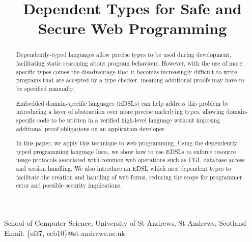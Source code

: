 \documentclass[]{sigplanconf}
\begin{document}
\newcommand{\idris}{\textsc{Idris}}
\newcommand{\idata}{\textsf{iData}}
\newcommand{\itasks}{\textsf{iTasks}}
\newcommand{\Idris}{\textsc{Idris}}
\setlength{\pdfpageheight}{\paperheight}
\setlength{\pdfpagewidth}{\paperwidth}

\exclusivelicense
{} 





\titlebanner{}        %
\preprintfooter{}   %

\title{Dependent Types for Safe and Secure Web Programming}
           {School of Computer Science, University of St Andrews, St Andrews, Scotland}
           {Email: \{sf37, ecb10\}@st-andrews.ac.uk}

\maketitle

\begin{abstract}
Dependently-typed languages allow precise types to be used during development,
facilitating static reasoning about program behaviour. However,
with the use of more specific types comes the disadvantage that it becomes increasingly difficult to
write programs that are accepted by a type checker, meaning additional proofs may have to be specified manually.

Embedded domain-specific languages (EDSLs) can help address this problem by
introducing a layer of abstraction over more precise underlying types,
allowing domain-specific code to be written in a verified high-level language without imposing additional proof
obligations on an application developer. 

In this paper, we apply this technique to web programming.  Using the
dependently typed programming language \Idris{}, we show how to use EDSLs to enforce resource usage protocols associated with common web operations such as CGI, database access and session handling. We also introduce an EDSL which uses dependent types to facilitate the creation and handling of web forms, reducing the scope for programmer error and possible security implications.

\end{abstract}
\end{document}
